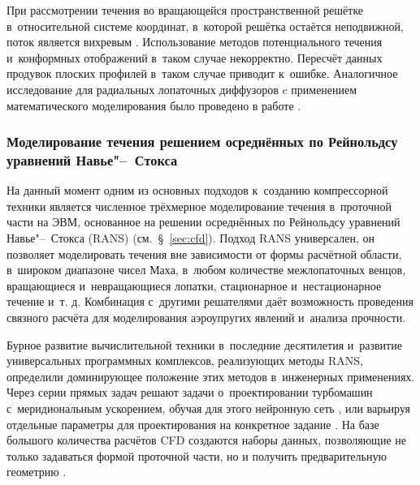 При рассмотрении течения во вращающейся пространственной решётке в~относительной системе координат, в~которой решётка остаётся неподвижной, поток является вихревым \autocite{Jukovskiy1967,Viktorov1969}.
Использование методов потенциального течения и~конформных отображений в~таком случае некорректно.
Пересчёт данных продувок плоских профилей в~таком случае приводит к~ошибке.
Аналогичное исследование для радиальных лопаточных диффузоров c применением математического моделирования было проведено в работе \autocite{Kuftov2004}.

\subsubsection{Моделирование течения решением осреднённых по Рейнольдсу уравнений Навье"--~Стокса}

На данный момент одним из основных подходов к~созданию компрессорной техники является численное трёхмерное моделирование течения в~проточной части на ЭВМ, основанное на решении осреднённых по Рейнольдсу уравнений  Навье"--~Стокса (RANS) (см.~\S~\ref{sec:cfd}).
Подход RANS универсален, он позволяет моделировать течения вне зависимости от формы расчётной области, в~широком диапазоне чисел Маха, в~любом количестве межлопаточных венцов, вращающиеся и~невращающиеся лопатки, стационарное и~нестационарное течение и~т. д.
Комбинация с~другими решателями даёт возможность проведения связного расчёта для моделирования аэроупругих явлений и~анализа прочности.

Бурное развитие вычислительной техники в~последние десятилетия и~развитие универсальных программных комплексов, реализующих методы RANS, определили доминирующее положение этих методов в~инженерных применениях.
Через серии прямых задач решают задачи о~проектировании турбомашин с~меридиональным ускорением, обучая для этого нейронную сеть \autocite{Bamberger2017}, или варьируя отдельные параметры для проектирования на конкретное задание \autocite{Qiushi2010,Kim2018,Stoewer2026, Stoewer2026a}.
На базе большого количества расчётов CFD создаются наборы данных, позволяющие не только задаваться формой проточной части, но и получить предварительную геометрию \autocite{Smyth2021}.

